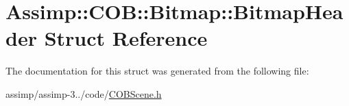 \hypertarget{struct_assimp_1_1_c_o_b_1_1_bitmap_1_1_bitmap_header}{\section{Assimp\+:\+:C\+O\+B\+:\+:Bitmap\+:\+:Bitmap\+Header Struct Reference}
\label{struct_assimp_1_1_c_o_b_1_1_bitmap_1_1_bitmap_header}
}


The documentation for this struct was generated from the following file\+:\begin{DoxyCompactItemize}
\item 
assimp/assimp-\/3../code/\hyperlink{_c_o_b_scene_8h}{C\+O\+B\+Scene.\+h}\end{DoxyCompactItemize}
